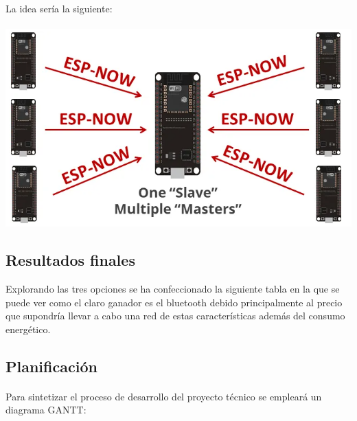 \documentclass[a4paper ,12pt, onecolumn]{article}
\begin{document}
\begin{enumerate}
                \paragraph{}
                La idea sería la siguiente:
                \paragraph{}
                \includegraphics[scale=0.5]{espnow.png}
            \end{enumerate}
            \subsection{Resultados finales}
            Explorando las tres opciones se ha confeccionado la siguiente tabla en la que se puede ver como el claro ganador es el  bluetooth debido 
            principalmente al precio que supondría llevar a cabo una red de estas características además del consumo energético.
            
            \subsection{Planificación}
        \paragraph{}
        Para sintetizar el proceso de desarrollo del proyecto técnico se empleará un diagrama GANTT: 
\end{document}

